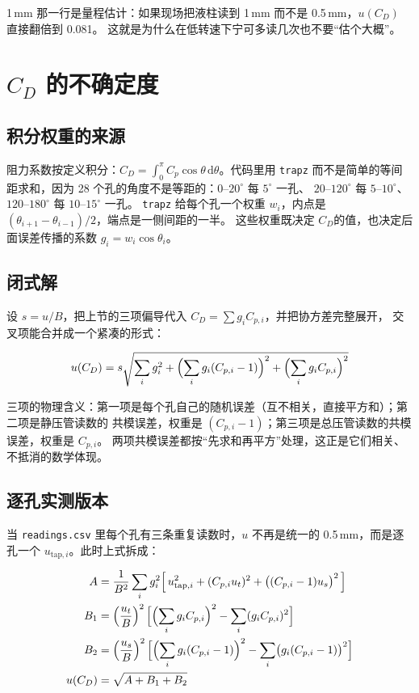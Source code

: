 \documentclass[11pt,a4paper]{ctexart}
\newcommand{\Cp}{\ensuremath{C_p}}
\newcommand{\CD}{\ensuremath{C_D}}
\begin{document}
1\,mm 那一行是量程估计：如果现场把液柱读到 1\,mm 而不是 0.5\,mm，$u(\CD)$ 直接翻倍到 0.081。
这就是为什么在低转速下宁可多读几次也不要“估个大概”。

\section{\CD{} 的不确定度}

\subsection{积分权重的来源}

阻力系数按定义积分：$\CD = \int_0^{\pi} \Cp \cos\theta \,\mathrm{d}\theta$。代码里用 \texttt{trapz}
而不是简单的等间距求和，因为 28 个孔的角度不是等距的：$0$--$20^\circ$ 每 $5^\circ$ 一孔、
$20$--$120^\circ$ 每 $5$--$10^\circ$、$120$--$180^\circ$ 每 $10$--$15^\circ$ 一孔。
\texttt{trapz} 给每个孔一个权重 $w_i$，内点是 $(\theta_{i+1} - \theta_{i-1})/2$，端点是一侧间距的一半。
这些权重既决定 \CD 的值，也决定后面误差传播的系数 $g_i = w_i \cos\theta_i$。

\subsection{闭式解}

设 $s = u/B$，把上节的三项偏导代入 $\CD = \sum g_i C_{p,i}$，并把协方差完整展开，
交叉项能合并成一个紧凑的形式：

\begin{equation}
u(\CD) = s\sqrt{\sum_i g_i^2 + \Bigl(\sum_i g_i (C_{p,i} - 1)\Bigr)^2 + \Bigl(\sum_i g_i C_{p,i}\Bigr)^2}
\end{equation}

三项的物理含义：第一项是每个孔自己的随机误差（互不相关，直接平方和）；第二项是静压管读数的
共模误差，权重是 $(C_{p,i} - 1)$；第三项是总压管读数的共模误差，权重是 $C_{p,i}$。
两项共模误差都按“先求和再平方”处理，这正是它们相关、不抵消的数学体现。

\subsection{逐孔实测版本}

当 \texttt{readings.csv} 里每个孔有三条重复读数时，$u$ 不再是统一的 0.5\,mm，而是逐孔一个
$u_{\text{tap},i}$。此时上式拆成：

\begin{align}
A &= \frac{1}{B^2}\sum_i g_i^2\Bigl[\,u_{\text{tap},i}^2 + (C_{p,i} u_t)^2 + \bigl((C_{p,i}-1)u_s\bigr)^2\,\Bigr] \\
B_1 &= \left(\frac{u_t}{B}\right)^2\Bigl[\Bigl(\sum_i g_i C_{p,i}\Bigr)^2 - \sum_i (g_i C_{p,i})^2\Bigr] \\
B_2 &= \left(\frac{u_s}{B}\right)^2\Bigl[\Bigl(\sum_i g_i (C_{p,i}-1)\Bigr)^2 - \sum_i \bigl(g_i (C_{p,i}-1)\bigr)^2\Bigr] \\
u(\CD) &= \sqrt{A + B_1 + B_2}
\end{align}
\end{document}
